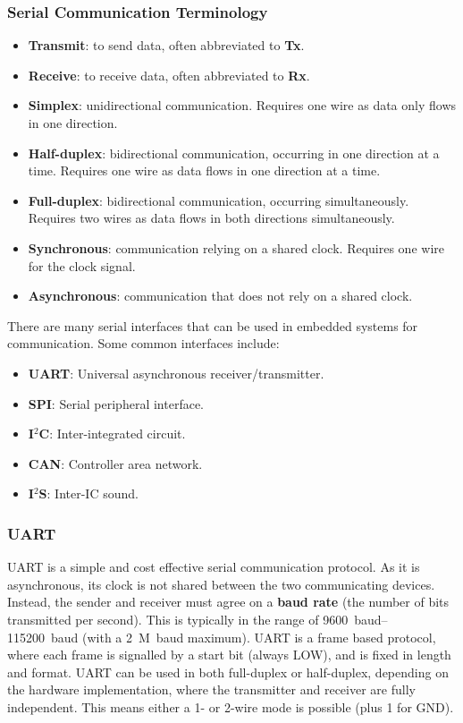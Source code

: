 \documentclass{article}
\begin{document}
\subsubsection{Serial Communication Terminology}
\begin{itemize}
    \item \textbf{Transmit}: to send data, often abbreviated to \textbf{Tx}.
    \item \textbf{Receive}: to receive data, often abbreviated to \textbf{Rx}.
    \item \textbf{Simplex}: unidirectional communication. Requires one wire as data only flows in one direction.
    \item \textbf{Half-duplex}: bidirectional communication, occurring in one direction at a time. Requires one wire as data flows in one direction at a time.
    \item \textbf{Full-duplex}: bidirectional communication, occurring simultaneously. Requires two wires as data flows in both directions simultaneously.
    \item \textbf{Synchronous}: communication relying on a shared clock. Requires one wire for the clock signal.
    \item \textbf{Asynchronous}: communication that does not rely on a shared clock.
\end{itemize}
There are many serial interfaces that can be used in embedded systems
for communication. Some common interfaces include:
\begin{itemize}
    \item \textbf{UART}: Universal asynchronous receiver/transmitter.
    \item \textbf{SPI}: Serial peripheral interface.
    \item \textbf{I\({}^2\)C}: Inter-integrated circuit.
    \item \textbf{CAN}: Controller area network.
    \item \textbf{I\({}^2\)S}: Inter-IC sound.
\end{itemize}
\subsubsection{UART}
UART is a simple and cost effective serial communication protocol. As
it is asynchronous, its clock is not shared between the two
communicating devices. Instead, the sender and receiver must agree on a
\textbf{baud rate} (the number of bits transmitted per second). This is
typically in the range of
\qtyrange[range-phrase=~to~]{9600}{115200}{baud} (with a
\qty{2}{M.baud} maximum). UART is a frame based protocol, where each
frame is signalled by a start bit (always LOW), and is fixed in length
and format. UART can be used in both full-duplex or half-duplex,
depending on the hardware implementation, where the transmitter and
receiver are fully independent. This means either a 1- or 2-wire mode
is possible (plus 1 for GND).
\end{document}
